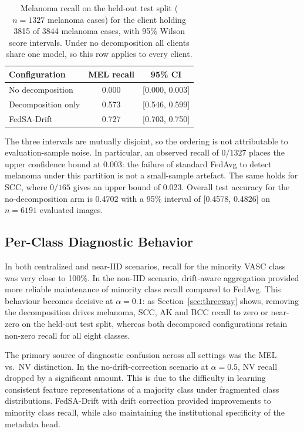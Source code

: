 \documentclass[utf8]{FrontiersinHarvard} %
\newcommand{\sadrift}{FedSA-Drift}
\begin{document}
\begin{table}[h]
\centering
\caption[Melanoma recall with confidence intervals]{Melanoma recall on the held-out test split ($n{=}1327$ melanoma cases) for the client holding 3815 of 3844 melanoma cases, with 95\% Wilson score intervals. Under no decomposition all clients share one model, so this row applies to every client.}
\label{tab:mel_ci}
\begin{tabular}{lcc}
\hline
\textbf{Configuration} & \textbf{MEL recall} & \textbf{95\% CI} \\
\hline
No decomposition   & 0.000 & [0.000, 0.003] \\
Decomposition only & 0.573 & [0.546, 0.599] \\
\sadrift{}         & 0.727 & [0.703, 0.750] \\
\hline
\end{tabular}
\end{table}

The three intervals are mutually disjoint, so the ordering is not attributable to evaluation-sample noise. In particular, an observed recall of $0/1327$ places the upper confidence bound at 0.003: the failure of standard FedAvg to detect melanoma under this partition is not a small-sample artefact. The same holds for SCC, where $0/165$ gives an upper bound of 0.023. Overall test accuracy for the no-decomposition arm is 0.4702 with a 95\% interval of [0.4578, 0.4826] on $n = 6191$ evaluated images.

\subsection{Per-Class Diagnostic Behavior}

In both centralized and near-IID scenarios, recall for the minority VASC class was very close to 100\%. In the non-IID scenario, drift-aware aggregation provided more reliable maintenance of minority class recall compared to FedAvg. This behaviour becomes decisive at $\alpha{=}0.1$: as Section~\ref{sec:threeway} shows, removing the decomposition drives melanoma, SCC, AK and BCC recall to zero or near-zero on the held-out test split, whereas both decomposed configurations retain non-zero recall for all eight classes.

The primary source of diagnostic confusion across all settings was the MEL vs.\ NV distinction. In the no-drift-correction scenario at $\alpha{=}0.5$, NV recall dropped by a significant amount. This is due to the difficulty in learning consistent feature representations of a majority class under fragmented class distributions. \sadrift{} with drift correction provided improvements to minority class recall, while also maintaining the institutional specificity of the metadata head.
\end{document}
